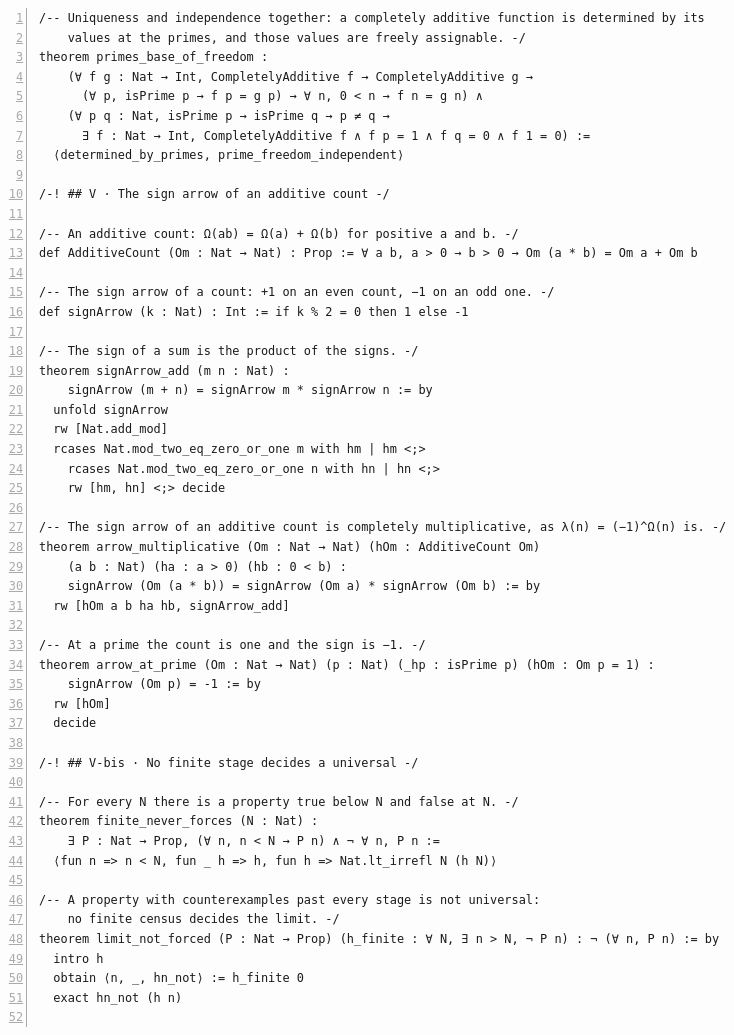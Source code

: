 \documentclass[10pt]{article}
\newcommand{\leansize}{\fontsize{5.5pt}{6.75pt}\selectfont}
\begin{document}
\begin{multicols}{2}
\begin{Verbatim}[numbers=left,firstnumber=1,numbersep=3pt,xleftmargin=2.6em,breaklines=true,breakanywhere=true,breakautoindent=false,breakindent=1.4em,breaksymbolleft={},breakanywheresymbolpre={},fontsize=\leansize]
/-- Uniqueness and independence together: a completely additive function is determined by its
    values at the primes, and those values are freely assignable. -/
theorem primes_base_of_freedom :
    (∀ f g : Nat → Int, CompletelyAdditive f → CompletelyAdditive g →
      (∀ p, isPrime p → f p = g p) → ∀ n, 0 < n → f n = g n) ∧
    (∀ p q : Nat, isPrime p → isPrime q → p ≠ q →
      ∃ f : Nat → Int, CompletelyAdditive f ∧ f p = 1 ∧ f q = 0 ∧ f 1 = 0) :=
  ⟨determined_by_primes, prime_freedom_independent⟩

/-! ## V · The sign arrow of an additive count -/

/-- An additive count: Ω(ab) = Ω(a) + Ω(b) for positive a and b. -/
def AdditiveCount (Om : Nat → Nat) : Prop := ∀ a b, a > 0 → b > 0 → Om (a * b) = Om a + Om b

/-- The sign arrow of a count: +1 on an even count, −1 on an odd one. -/
def signArrow (k : Nat) : Int := if k % 2 = 0 then 1 else -1

/-- The sign of a sum is the product of the signs. -/
theorem signArrow_add (m n : Nat) :
    signArrow (m + n) = signArrow m * signArrow n := by
  unfold signArrow
  rw [Nat.add_mod]
  rcases Nat.mod_two_eq_zero_or_one m with hm | hm <;>
    rcases Nat.mod_two_eq_zero_or_one n with hn | hn <;>
    rw [hm, hn] <;> decide

/-- The sign arrow of an additive count is completely multiplicative, as λ(n) = (−1)^Ω(n) is. -/
theorem arrow_multiplicative (Om : Nat → Nat) (hOm : AdditiveCount Om)
    (a b : Nat) (ha : a > 0) (hb : 0 < b) :
    signArrow (Om (a * b)) = signArrow (Om a) * signArrow (Om b) := by
  rw [hOm a b ha hb, signArrow_add]

/-- At a prime the count is one and the sign is −1. -/
theorem arrow_at_prime (Om : Nat → Nat) (p : Nat) (_hp : isPrime p) (hOm : Om p = 1) :
    signArrow (Om p) = -1 := by
  rw [hOm]
  decide

/-! ## V-bis · No finite stage decides a universal -/

/-- For every N there is a property true below N and false at N. -/
theorem finite_never_forces (N : Nat) :
    ∃ P : Nat → Prop, (∀ n, n < N → P n) ∧ ¬ ∀ n, P n :=
  ⟨fun n => n < N, fun _ h => h, fun h => Nat.lt_irrefl N (h N)⟩

/-- A property with counterexamples past every stage is not universal:
    no finite census decides the limit. -/
theorem limit_not_forced (P : Nat → Prop) (h_finite : ∀ N, ∃ n > N, ¬ P n) : ¬ (∀ n, P n) := by
  intro h
  obtain ⟨n, _, hn_not⟩ := h_finite 0
  exact hn_not (h n)


\end{Verbatim}
\end{multicols}
\end{document}
